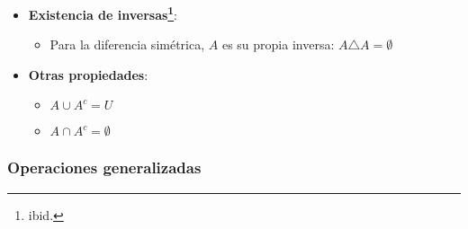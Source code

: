 \begin{itemize}
	\item \textbf{Existencia de inversas\footnote{ibid.}}:
	\begin{itemize}
		\item Para la diferencia simétrica, $A$ es su propia inversa: \( A \triangle A = \emptyset \)
	\end{itemize}
	
	\item \textbf{Otras propiedades}:
	\begin{itemize}
		\item \(A \cup A^c = U\)
		\item \(A \cap A^c = \emptyset\)
	\end{itemize}
	
\end{itemize}

\subsubsection{Operaciones generalizadas}


